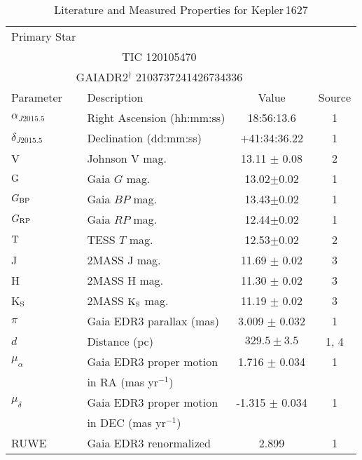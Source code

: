\begin{table*}
\scriptsize
\setlength{\tabcolsep}{2pt}
\centering
\caption{Literature and Measured Properties for Kepler$\,$1627}
\label{tab:starparams}
\begin{tabular}{llcc}
  \hline
  \hline
Primary Star\dotfill & \\
\multicolumn{3}{c}{TIC 120105470} \\
\multicolumn{3}{c}{GAIADR2$^\dagger$ 2103737241426734336} \\
\hline
\hline
Parameter & Description & Value & Source\\
\hline 
$\alpha_{J2015.5}$\dotfill	&Right Ascension (hh:mm:ss)\dotfill & 18:56:13.6 & 1	\\
$\delta_{J2015.5}$\dotfill	&Declination (dd:mm:ss)\dotfill & +41:34:36.22 & 1	\\
%
V\dotfill			&Johnson V mag.\dotfill & 13.11 $\pm$ 0.08		& 2	\\
${\rm G}$\dotfill     & Gaia $G$ mag.\dotfill     & 13.02$\pm$0.02 & 1\\
$G_{\rm BP}$\dotfill     & Gaia $BP$ mag.\dotfill     & 13.43$\pm$0.02 & 1\\
$G_{\rm RP}$\dotfill     & Gaia $RP$ mag.\dotfill     & 12.44$\pm$0.02 & 1\\
${\rm T}$\dotfill     & TESS $T$ mag.\dotfill     & 12.53$\pm$0.02 & 2\\
J\dotfill			& 2MASS J mag.\dotfill & 11.69  $\pm$ 0.02	& 3	\\
H\dotfill			& 2MASS H mag.\dotfill & 11.30 $\pm$ 0.02	    &  3	\\
K$_{\rm S}$\dotfill			& 2MASS ${\rm K_S}$ mag.\dotfill & 11.19 $\pm$ 0.02 &  3	\\
%
$\pi$\dotfill & Gaia EDR3 parallax (mas) \dotfill & 3.009 $\pm$ 0.032 &  1 \\
$d$\dotfill & Distance (pc)\dotfill & $329.5 \pm 3.5$ & 1, 4 \\
$\mu_{\alpha}$\dotfill		& Gaia EDR3 proper motion\dotfill & 1.716 $\pm$ 0.034 & 1 \\
                    & \hspace{3pt} in RA (mas yr$^{-1}$)	&  \\
$\mu_{\delta}$\dotfill		& Gaia EDR3 proper motion\dotfill 	&  -1.315 $\pm$ 0.034 &  1 \\
                    & \hspace{3pt} in DEC (mas yr$^{-1}$) &  \\
RUWE\dotfill		& Gaia EDR3 renormalized\dotfill 	&  2.899 &  1 \\

\end{tabular}
\end{table*}
